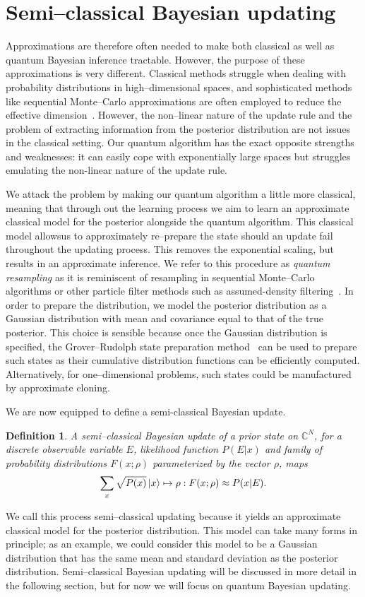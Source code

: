 \documentclass[aps,amsmath,onecolumn,amssymb,notitlepage]{revtex4-1}
\newtheorem{definition}{Definition}
\begin{document}
\section{Semi--classical Bayesian updating}
Approximations are therefore often needed to make both classical as well as quantum Bayesian inference tractable.  However, the purpose of these approximations is very different.  Classical methods struggle when dealing with probability distributions in high--dimensional spaces, and sophisticated methods like sequential Monte--Carlo approximations are often employed to reduce the effective dimension~\cite{liu_combined_2001,minka2001expectation,van2000unscented}.  However, the non--linear nature of the update rule and the problem of extracting information from the posterior distribution are not issues in the classical setting.  Our quantum algorithm has the exact opposite strengths and weaknesses: it can easily cope with exponentially large spaces but struggles emulating the non-linear nature of the update rule.

We attack the problem by making our quantum algorithm a little more classical, meaning that through out the learning process we aim to learn an approximate classical model for the posterior alongside the quantum algorithm.  This classical model allowsus to approximately re--prepare the state should an update fail throughout the updating process.  This removes the exponential scaling, but results in an approximate inference.  We refer to this procedure as \emph{quantum resampling} as it is reminiscent of resampling in sequential Monte--Carlo algorithms or other particle filter methods such as assumed-density filtering~\cite{minka2001expectation}.  In order to prepare the distribution,
we model the posterior distribution as a Gaussian distribution with mean and covariance equal to that of the true posterior.  This choice is sensible because once the Gaussian distribution is specified, the Grover--Rudolph state preparation method~\cite{GR02} can be used to prepare such states as their cumulative distribution functions can be efficiently computed.
Alternatively, for one--dimensional problems, such states could be manufactured by approximate cloning.

We are now equipped to define a semi-classical Bayesian update.
\begin{definition}
A semi--classical Bayesian update of a prior state on $\mathbb{C}^N$, for a discrete observable variable $E$, likelihood function $P(E|x)$ and family of probability distributions $F(x;\rho)$ parameterized by the vector $\rho$, maps 
$$\sum_x \sqrt{P(x)} \left|x\right\rangle\mapsto \rho: F(x;\rho) \approx P(x|E). $$\label{def:semi}
\end{definition}
We call this process semi--classical updating because it yields an approximate classical model for the posterior distribution.  This model can take many forms in principle; as an example, we could consider this model to be a Gaussian distribution that has the same mean and standard deviation as the posterior distribution.
Semi--classical Bayesian updating will be discussed in more detail in the following section, but for now we will focus on quantum Bayesian updating.
\end{document}
